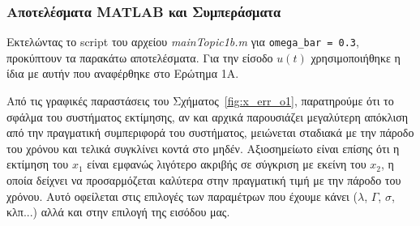 \documentclass[12pt]{article} %
\numberwithin{equation}{section}  %
\begin{document}
\subsubsection{Αποτελέσματα MATLAB και Συμπεράσματα}

Εκτελώντας το script του αρχείου \textit{mainTopic1b.m} για {\small \texttt{omega\_bar = 0.3}}, προκύπτουν τα παρακάτω αποτελέσματα. 
Για την είσοδο $u(t)$ χρησιμοποιήθηκε η ίδια με αυτήν που αναφέρθηκε στο Ερώτημα 1Α.

Από τις γραφικές παραστάσεις του Σχήματος~\ref{fig:x_err_o1}, παρατηρούμε ότι το σφάλμα του συστήματος εκτίμησης, 
αν και αρχικά παρουσιάζει μεγαλύτερη απόκλιση από την πραγματική συμπεριφορά του συστήματος, 
μειώνεται σταδιακά με την πάροδο του χρόνου και τελικά συγκλίνει κοντά στο μηδέν. 
Αξιοσημείωτο είναι επίσης ότι η εκτίμηση του $x_1$ είναι εμφανώς λιγότερο ακριβής σε σύγκριση με εκείνη του $x_2$, 
η οποία δείχνει να προσαρμόζεται καλύτερα στην πραγματική τιμή με την πάροδο του χρόνου. 
Αυτό οφείλεται στις επιλογές των παραμέτρων που έχουμε κάνει ($\lambda$, $\Gamma$, $\sigma$, κλπ...) αλλά και στην επιλογή της εισόδου μας. 
\end{document}
